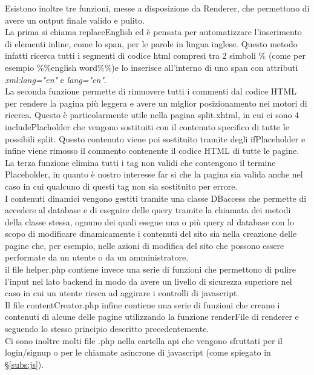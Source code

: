 Esistono inoltre tre funzioni, messe a disposizione da Renderer, che permettono di avere un output finale valido e pulito.\\ La prima si chiama replaceEnglish ed è pensata per automatizzare l'inserimento di elementi inline, come lo span, per le parole in lingua
inglese. Questo metodo infatti ricerca tutti i segmenti di codice html compresi tra 2 simboli \% (come per esempio \%\%english word\%\%)e lo inserisce all'interno di uno span con attributi \textit{xml:lang="en"} e \textit{lang="en"}.\\ La seconda funzione permette
di rimuovere tutti i commenti dal codice HTML per rendere la pagina più leggera e avere un miglior posizionamento nei motori di ricerca. Questo è particolarmente utile nella pagina split.xhtml, in cui ci sono 4 includePlacholder che vengono sostituiti con il 
contenuto specifico di tutte le possibili split. Questo contenuto viene poi sostituito tramite degli ifPlaceholder e infine viene rimosso il commento contenente il codice HTML di tutte le pagine.\\ La terza funzione elimina tutti i tag non validi che contengono 
il termine Placeholder, in quanto è nostro interesse far si che la pagina sia valida anche nel caso in cui qualcuno di questi tag non sia sostituito per errore.\\

I contenuti dinamici vengono gestiti tramite una classe DBaccess che permette di accedere al database e di eseguire delle query tramite la chiamata dei metodi della classe stessa, ognuno dei quali esegue una o più query al database con lo scopo di modificare 
dinamicamente i contenuti del sito sia nella creazione delle pagine che, per esempio, nelle azioni di modifica del sito che possono essere performate da un utente o da un amministratore.\\
il file helper.php contiene invece una serie di funzioni che permettono di pulire l'input nel lato backend in modo da avere un livello di sicurezza superiore nel caso in cui un utente riesca ad aggirare i controlli di javascript.\\
Il file contentCreator.php infine contiene una serie di funzioni che creano i contenuti di alcune delle pagine utilizzando la funzione renderFile di renderer e seguendo lo stesso principio descritto precedentemente.\\

Ci sono inoltre molti file .php nella cartella api che vengono sfruttati per il login/signup o per le chiamate asincrone di javascript (come spiegato in \S\ref{subs:js}).



